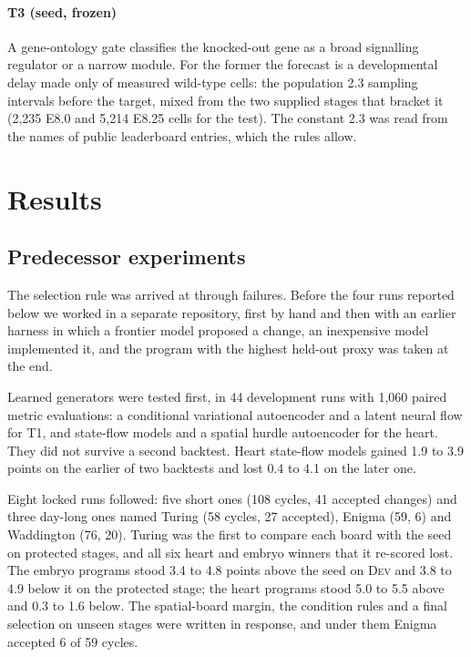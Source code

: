 \documentclass[9pt,twocolumn,a4paper]{extarticle}
\newcommand{\dev}{\textsc{Dev}}
\begin{document}
\paragraph{T3 (seed, frozen)} A gene-ontology gate classifies the knocked-out gene as a broad signalling regulator
or a narrow module. For the former the forecast is a developmental delay made only of measured wild-type cells: the
population 2.3 sampling intervals before the target, mixed from the two supplied stages that bracket it (2,235 E8.0
and 5,214 E8.25 cells for the test). The constant 2.3 was read from the names of public leaderboard entries, which
the rules allow.

\section{Results}

\subsection{Predecessor experiments}
\label{sec:pre}

The selection rule was arrived at through failures. Before the four runs reported below we worked in a separate
repository, first by hand and then with an earlier harness in which a frontier model proposed a change, an
inexpensive model implemented it, and the program with the highest held-out proxy was taken at the end.

Learned generators were tested first, in 44 development runs with 1,060 paired metric evaluations: a conditional
variational autoencoder and a latent neural flow for T1, and state-flow models and a spatial hurdle autoencoder for
the heart. They did not survive a second backtest. Heart state-flow models gained 1.9 to 3.9 points on the earlier
of two backtests and lost 0.4 to 4.1 on the later one.

Eight locked runs followed: five short ones (108 cycles, 41 accepted changes) and three day-long ones named Turing
(58 cycles, 27 accepted), Enigma (59, 6) and Waddington (76, 20). Turing was the first to compare each board with
the seed on protected stages, and all six heart and embryo winners that it re-scored lost. The embryo programs stood
3.4 to 4.8 points above the seed on \dev{} and 3.8 to 4.9 below it on the protected stage; the heart programs stood
5.0 to 5.5 above and 0.3 to 1.6 below. The spatial-board margin, the condition rules and a final selection on unseen
stages were written in response, and under them Enigma accepted 6 of 59 cycles.
\end{document}
